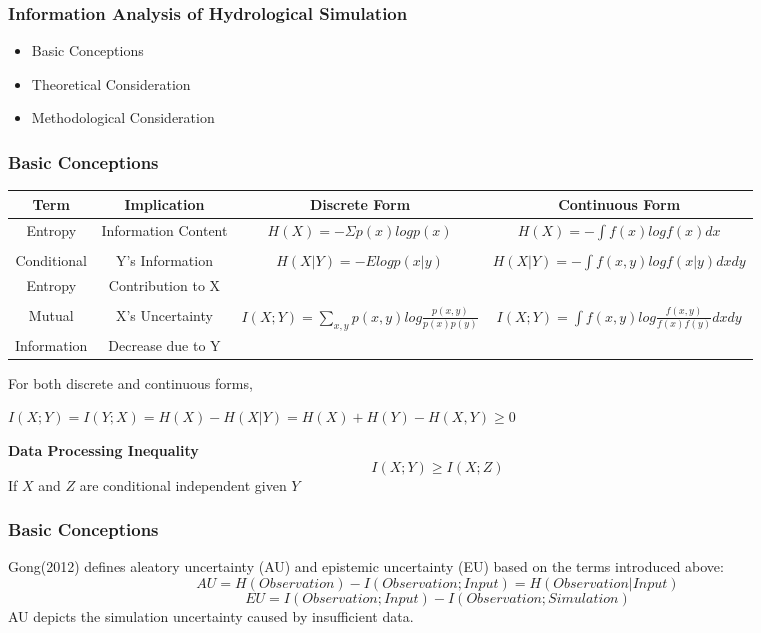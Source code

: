 \documentclass{beamer}
\begin{document}
\begin{CJK}{UTF8}{gkai}
\begin{frame}
\frametitle{Information Analysis of Hydrological Simulation}
\begin{itemize}
\item Basic Conceptions
\item Theoretical Consideration
\item Methodological Consideration
\end{itemize}
\end{frame}

\begin{frame}
\frametitle{Basic Conceptions}
\begin{table}[H]\tiny
\begin{center}
\begin{tabular}{cccc}
\toprule
Term  & Implication & Discrete Form & Continuous Form \\
\midrule
Entropy
&
Information Content         
& 
$H(X)=-\Sigma p(x)logp(x)$       
&
$H(X)=-\int f(x)logf(x)dx$        \\
\\
Conditional 
&
Y's Information          
& 
$H(X|Y)=-Elogp(x|y)$        
&
$H(X|Y)=-\int f(x,y)log f(x|y) dxdy$         \\
Entropy
&
Contribution to X         
& 
       
&        \\
\\
Mutual 
&
X's Uncertainty         
& 
$I(X;Y)=\sum_{x,y}p(x,y)log\frac{p(x,y)}{p(x)p(y)}$       
& 
$I(X;Y)=\int f(x,y)log\frac{f(x,y)}{f(x)f(y)}dxdy$       \\
Information
&
Decrease due to Y          
& 
       
&        \\
 \bottomrule
\end{tabular}
\end{center}
\end{table}
For both discrete and continuous forms,
 
\small $I(X;Y)=I(Y;X)= H(X)-H(X|Y)=H(X)+H(Y)-H(X,Y)\geq 0$ 

\textbf{Data Processing Inequality}
\begin{equation*}
I(X;Y) \geq I(X;Z)
\end{equation*}
If $X$ and $Z$ are conditional independent given $Y$



\end{frame}

\begin{frame}
\frametitle{Basic Conceptions}
Gong(2012) defines aleatory uncertainty (AU) and epistemic uncertainty (EU) based on the terms introduced above:
\begin{equation*}
AU= H(Observation)-I(Observation;Input)=H(Observation|Input)
\end{equation*}
\begin{equation*}
EU=I(Observation;Input)-I(Observation;Simulation)
\end{equation*}
AU depicts the simulation uncertainty caused by insufficient data.


\end{frame}
\end{CJK}
\end{document}
